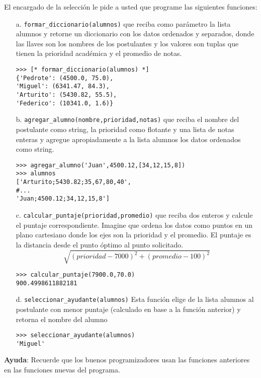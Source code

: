 El encargado de la selección le pide a usted que programe las siguientes funciones:
\begin{itemize}
    \item[a.] \texttt{formar\_diccionario(alumnos)} que reciba como parámetro la lista alumnos y retorne un diccionario con los datos ordenados y separados, donde las llaves son los nombres de los postulantes y los valores son tuplas que tienen la prioridad académica y el promedio de notas.
    \begin{lstlisting}[style=consola]
>>> [* formar_diccionario(alumnos) *]
{'Pedrote': (4500.0, 75.0), 
'Miguel': (6341.47, 84.3), 
'Arturito': (5430.82, 55.5), 
'Federico': (10341.0, 1.6)}
    \end{lstlisting}
    \item[b.] \texttt{agregar\_alumno(nombre,prioridad,notas)} que reciba el nombre del postulante como string, la prioridad como flotante y una lista de notas enteras y agregue apropiadamente a la lista alumnos los datos ordenados como string.
    \begin{lstlisting}[style=consola]
>>> agregar_alumno('Juan',4500.12,[34,12,15,8])
>>> alumnos
['Arturito;5430.82;35,67,80,40', 
#... 
'Juan;4500.12;34,12,15,8']
    \end{lstlisting}
    \item[c.] \texttt{calcular\_puntaje(prioridad,promedio)} que reciba dos enteros y calcule el puntaje correspondiente. Imagine que ordena los datos como puntos en un plano cartesiano donde los ejes son la prioridad y el promedio. El puntaje es la distancia desde el punto óptimo al punto solicitado.
    \begin{displaymath}
    \sqrt{(prioridad-7000)^{2}+(promedio-100)^{2}}
    \end{displaymath}
    \begin{lstlisting}[style=consola]
>>> calcular_puntaje(7900.0,70.0)
900.4998611882181
    \end{lstlisting}
    \item[d.] \texttt{seleccionar\_ayudante(alumnos)} Esta función elige de la lista alumnos al postulante con menor puntaje (calculado en base a la función anterior) y retorna el nombre del alumno
    \begin{lstlisting}[style=consola]
>>> seleccionar_ayudante(alumnos)
'Miguel'
    \end{lstlisting}
\end{itemize}

\textbf{Ayuda}: Recuerde que los buenos programizadores usan las funciones anteriores en las funciones nuevas del programa. 